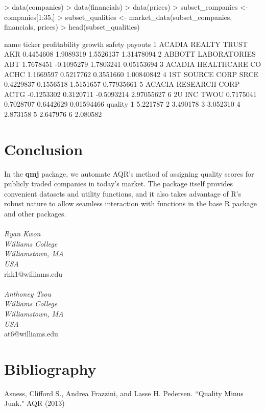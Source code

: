 \documentclass[titlepage]{article}
\begin{document}
\begin{Schunk}
\begin{Sinput}
> data(companies)
> data(financials)
> data(prices)
> subset_companies <- companies[1:35,]
> subset_qualities <- market_data(subset_companies, financials, prices)
> head(subset_qualities)
\end{Sinput}
\begin{Soutput}
                  name ticker profitability     growth     safety    payouts
1  ACADIA REALTY TRUST    AKR     0.4454608  1.9089319  1.5526137 1.31478094
2  ABBOTT LABORATORIES    ABT     1.7678451 -0.1095279  1.7803241 0.05153694
3 ACADIA HEALTHCARE CO   ACHC     1.1669597  0.5217762  0.3551660 1.00840842
4      1ST SOURCE CORP   SRCE     0.4229837  0.1556518  1.5151657 0.77935661
5 ACACIA RESEARCH CORP   ACTG    -0.1253302  0.3120711 -0.5093214 2.97055627
6               2U INC   TWOU     0.7175041  0.7028707  0.6442629 0.01594466
   quality
1 5.221787
2 3.490178
3 3.052310
4 2.873158
5 2.647976
6 2.080582
\end{Soutput}
\end{Schunk}

\section*{Conclusion}

In the \textbf{qmj} package, we automate AQR's method of assigning quality scores for publicly traded companies in today's market. The package itself provides convenient datasets and utility functions, and it also takes advantage of R's robust nature to allow seamless interaction with functions in the base R package and other packages.
\\
\\
\emph{Ryan Kwon}
\\
\emph{Williams College}
\\
\emph{Williamstown, MA}
\\
\emph{USA}
\\
rhk1@williams.edu
\\
\\
\emph{Anthoney Tsou}
\\
\emph{Williams College}
\\
\emph{Williamstown, MA}
\\
\emph{USA}
\\
at6@williams.edu

\section*{Bibliography}
Asness, Clifford S., Andrea Frazzini, and Lasse H. Pedersen. ``Quality Minus Junk." AQR (2013)
\end{document}
